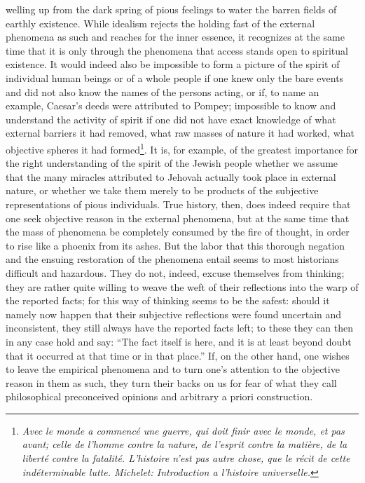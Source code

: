 \documentclass[12pt]{book}
\newcommand{\opage}[1]{\marginnote{\footnotesize\textit{[#1]}}}
\begin{document}
welling up from the dark spring of pious feelings to water the barren fields of
earthly existence. While idealism rejects the holding fast of the external
phenomena as such and reaches for the inner essence, it recognizes at the same
time that it is only through the phenomena that access stands open to spiritual
existence. It would indeed also be impossible to form a picture of the spirit of
individual human beings or of a whole people if one knew only the bare events
and did not also know the names of the persons acting, or if, to name an
example, Caesar's deeds were attributed to Pompey; impossible to know and
understand the activity of spirit if one did not have exact knowledge of what
external barriers it had removed, what raw masses of nature it had worked, what
objective spheres it had formed\footnote{\textit{Avec le monde a commencé une
guerre, qui doit finir avec le monde, et pas avant; celle de l'homme contre la
nature, de l'esprit contre la matière, de la liberté contre la fatalité.
L'histoire n'est pas autre chose, que le récit de cette indéterminable lutte.
Michelet: Introduction a l'histoire universelle.}}. It is, for example, of the
greatest importance for the right understanding of the spirit of the Jewish
people whether we assume that the many miracles attributed to Jehovah actually
took place in external nature, or whether we take them merely to be products of
the subjective representations of pious individuals.
\opage{20} True history, then, does indeed require that one seek objective reason in the
external phenomena, but at the same time that the mass of phenomena be
completely consumed by the fire of thought, in order to rise like a phoenix from
its ashes. But the labor that this thorough negation and the ensuing
restoration of the phenomena entail seems to most historians difficult and
hazardous. They do not, indeed, excuse themselves from thinking; they are rather
quite willing to weave the weft of their reflections into the warp of the
reported facts; for this way of thinking seems to be the safest: should it
namely now happen that their subjective reflections were found uncertain and
inconsistent, they still always have the reported facts left; to these they can
then in any case hold and say: ``The fact itself is here, and it is at least
beyond doubt that it occurred at that time or in that place.'' If, on the other
hand, one wishes to leave the empirical phenomena and to turn one's attention
to the objective reason in them as such, they turn their backs on us for fear
of what they call philosophical preconceived opinions and arbitrary a priori
construction.
\end{document}
